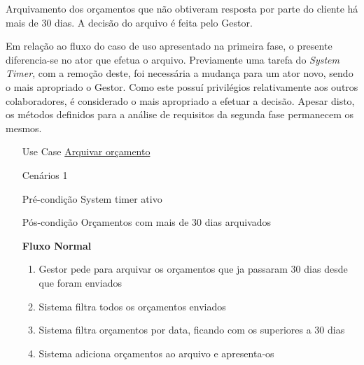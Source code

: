 \documentclass[../relatorio.tex]{subfiles}
\begin{document}
Arquivamento dos orçamentos que não obtiveram resposta por parte do cliente há mais de 30 dias.
A decisão do arquivo é feita pelo Gestor.

Em relação ao fluxo do caso de uso apresentado na primeira fase, o presente diferencia-se no ator 
que efetua o arquivo. 
Previamente uma tarefa do \textit{System Timer}, com a remoção deste, foi necessária a mudança para 
um ator novo, sendo o mais apropriado o Gestor.
Como este possuí privilégios relativamente aos outros colaboradores, é considerado o mais apropriado 
a efetuar a decisão.
Apesar disto, os métodos definidos para a análise de requisitos da segunda fase permanecem os mesmos.
\begin{itemize}
    \item[Use Case] {\underline{Arquivar orçamento}}
    \item[Cenários] {1}
    \item[Pré-condição] {System timer ativo}
    \item[Pós-condição] {Orçamentos com mais de 30 dias arquivados}
          \begin{flushleft}
              \textbf{Fluxo Normal}
          \end{flushleft}
          \begin{enumerate}
              \item Gestor pede para arquivar os orçamentos que ja passaram 30 dias desde que foram enviados
              \item Sistema filtra todos os orçamentos enviados
              \item Sistema filtra orçamentos por data, ficando com os superiores a 30 dias
              \item Sistema adiciona orçamentos ao arquivo e apresenta-os
          \end{enumerate}
\end{itemize}
\end{document}
